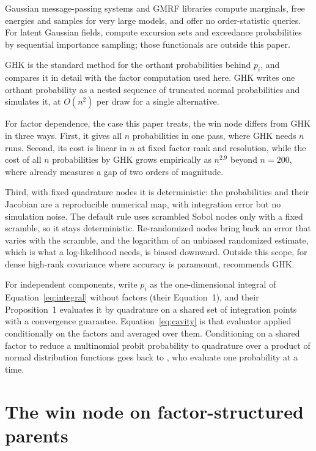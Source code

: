 \documentclass[11pt]{article}
\begin{document}
Gaussian message-passing systems and GMRF libraries compute marginals,
free energies and samples for very large models, and offer no
order-statistic queries. For latent Gaussian fields, \citet{bolin2015}
compute excursion sets and exceedance probabilities by sequential
importance sampling; those functionals are outside this paper.

GHK \citep{geweke1989,keane1994,hajivassiliou1996} is the standard method for
the orthant probabilities behind $p_i$, and \citet{cotton2026}
compares it in detail with the factor computation used here. GHK
writes one orthant probability as a nested sequence of truncated
normal probabilities and simulates it, at $O(n^2)$ per draw for a
single alternative.

For factor dependence, the case this paper treats, the win node
differs from GHK in three ways. First, it gives all $n$ probabilities
in one pass, where GHK needs $n$ runs. Second, its cost is linear in
$n$ at fixed factor rank and resolution, while the cost of all $n$
probabilities by GHK grows empirically as $n^{2.9}$ beyond $n=200$, where \citet{cotton2026}
already measures a gap of two orders of magnitude.

Third, with fixed quadrature nodes
it is deterministic: the probabilities and their Jacobian are a
reproducible numerical map, with integration error but no simulation
noise. The default rule uses scrambled Sobol nodes only with a fixed
scramble, so it stays deterministic. Re-randomized nodes bring back an
error that varies with the scramble, and the logarithm of an unbiased
randomized estimate, which is what a log-likelihood needs, is biased
downward. Outside this scope, for dense high-rank covariance where
accuracy is paramount, \citet{cotton2026} recommends GHK.

For independent components, \citet{menet2025} write $p_i$ as the
one-dimensional integral of Equation~\eqref{eq:integral} without
factors (their Equation~1), and their Proposition~1 evaluates it by
quadrature on a shared set of integration points with a convergence
guarantee. Equation~\eqref{eq:cavity} is that evaluator applied
conditionally on the factors and averaged over them. Conditioning on
a shared factor to reduce a multinomial probit probability to
quadrature over a product of normal distribution functions goes back
to \citet{butler1982}, who evaluate one probability at a time.

\section{The win node on factor-structured parents}
\label{sec:factor}
\end{document}
